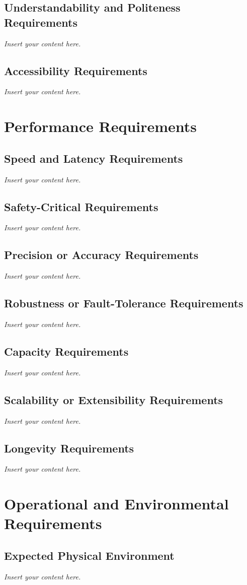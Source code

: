 \documentclass[12pt]{article}
\newcommand{\lips}{\textit{Insert your content here.}}
\begin{document}
\subsection{Understandability and Politeness Requirements}
\lips
\subsection{Accessibility Requirements}
\lips

\section{Performance Requirements}
\subsection{Speed and Latency Requirements}
\lips
\subsection{Safety-Critical Requirements}
\lips
\subsection{Precision or Accuracy Requirements}
\lips
\subsection{Robustness or Fault-Tolerance Requirements}
\lips
\subsection{Capacity Requirements}
\lips
\subsection{Scalability or Extensibility Requirements}
\lips
\subsection{Longevity Requirements}
\lips

\section{Operational and Environmental Requirements}
\subsection{Expected Physical Environment}
\lips
\end{document}
